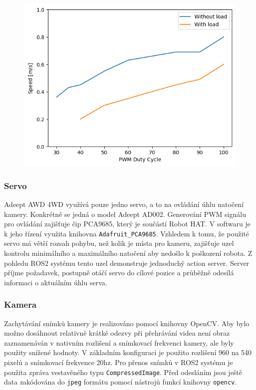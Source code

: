 \begin{figure}[h!]
	\centering
	\includegraphics[scale=0.75]{obrazky-figures/motors_graph.png}
	\caption{}
	\label{}
\end{figure}

\subsubsection*{Servo}
Adeept AWD 4WD využívá pouze jedno servo, a to na ovládání úhlu natočení kamery. Konkrétně se jedná o model Adeept AD002. Generování PWM signálu pro ovládání zajišťuje čip PCA9685, který je součástí Robot HAT. V softwaru je k jeho řízení využita knihovna \verb|Adafruit_PCA9685|. Vzhledem k tomu, že použité servo má větší rozsah pohybu, než kolik je místa pro kameru, zajišťuje uzel kontrolu minimálního a maximálního natočení aby nedošlo k poškození robota. Z pohledu ROS2 systému tento uzel demonstruje jednoduchý action server. Server příjme požadavek, postupně otáčí servo do cílové pozice a průběžně odesílá informaci o aktuálním úhlu serva.

\subsubsection*{Kamera}
Zachytávání snímků kamery je realizováno pomocí knihovny OpenCV. Aby bylo možno dosáhnout relativně krátké odezvy při přehrávání videa není obraz zaznamenáván v nativním rozlišení a snímkovací frekvenci kamery, ale byly použity snížené hodnoty. V základním konfiguraci je použito rozlišení 960 na 540 pixelů a snímkovací frekvence 20hz.
Pro přenos snímků v ROS2 systému je použita zpráva vestavěného typu \verb|CompressedImage|. Před odesláním jsou ještě data zakódována do \verb|jpeg| formátu pomocí nástrojů funkcí knihovny \verb|opencv|.

